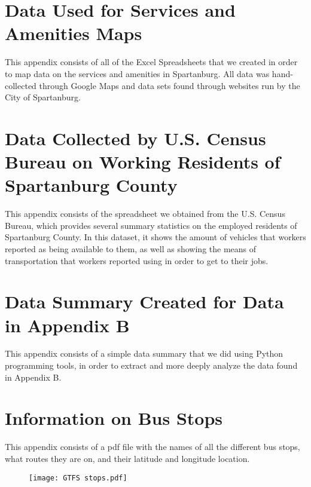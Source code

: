 \section{Data Used for Services and Amenities Maps}

This appendix consists of all of the Excel Spreadsheets that we created in order to map data on the services and amenities in Spartanburg. All data was hand-collected through Google Maps and data sets found through websites run by the City of Spartanburg.



\section{Data Collected by U.S. Census Bureau on Working Residents of Spartanburg County}

This appendix consists of the spreadsheet we obtained from the U.S. Census Bureau, which provides several summary statistics on the employed residents of Spartanburg County. In this dataset, it shows the amount of vehicles that workers reported as being available to them, as well as showing the means of transportation that workers reported using in order to get to their jobs.



\section{Data Summary Created for Data in Appendix B}

This appendix consists of a simple data summary that we did using Python programming tools, in order to extract and more deeply analyze the data found in Appendix B.



\section{Information on Bus Stops}

This appendix consists of a pdf file with the names of all the different bus stops, what routes they are on, and their latitude and longitude location.
\begin{figure}
    \centering
    \texttt{[image: GTFS stops.pdf]}
\end{figure}